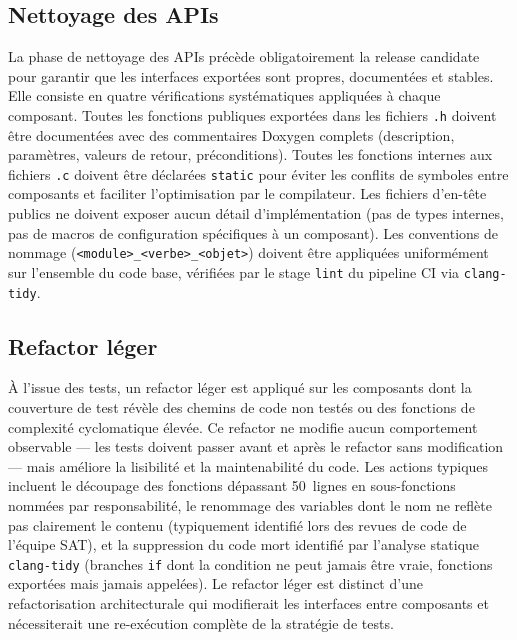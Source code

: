 \subsection{Nettoyage des APIs}
\label{subsec:apiclean}

La phase de nettoyage des APIs précède obligatoirement la release
candidate pour garantir que les interfaces exportées sont propres,
documentées et stables. Elle consiste en quatre vérifications
systématiques appliquées à chaque composant. Toutes les fonctions
publiques exportées dans les fichiers \texttt{.h} doivent être
documentées avec des commentaires Doxygen complets (description,
paramètres, valeurs de retour, préconditions). Toutes les fonctions
internes aux fichiers \texttt{.c} doivent être déclarées \texttt{static}
pour éviter les conflits de symboles entre composants et faciliter
l'optimisation par le compilateur. Les fichiers d'en-tête publics
ne doivent exposer aucun détail d'implémentation (pas de types internes,
pas de macros de configuration spécifiques à un composant). Les
conventions de nommage (\texttt{<module>\_<verbe>\_<objet>}) doivent
être appliquées uniformément sur l'ensemble du code base, vérifiées
par le stage \texttt{lint} du pipeline CI via \texttt{clang-tidy}.

\subsection{Refactor léger}
\label{subsec:refactor}

À l'issue des tests, un refactor léger est appliqué sur les composants
dont la couverture de test révèle des chemins de code non testés ou
des fonctions de complexité cyclomatique élevée. Ce refactor ne
modifie aucun comportement observable — les tests doivent passer
avant et après le refactor sans modification — mais améliore la
lisibilité et la maintenabilité du code. Les actions typiques incluent
le découpage des fonctions dépassant 50~lignes en sous-fonctions
nommées par responsabilité, le renommage des variables dont le nom
ne reflète pas clairement le contenu (typiquement identifié lors des
revues de code de l'équipe SAT), et la suppression du code mort
identifié par l'analyse statique \texttt{clang-tidy} (branches
\texttt{if} dont la condition ne peut jamais être vraie, fonctions
exportées mais jamais appelées). Le refactor léger est distinct d'une
refactorisation architecturale qui modifierait les interfaces entre
composants et nécessiterait une re-exécution complète de la stratégie
de tests.

